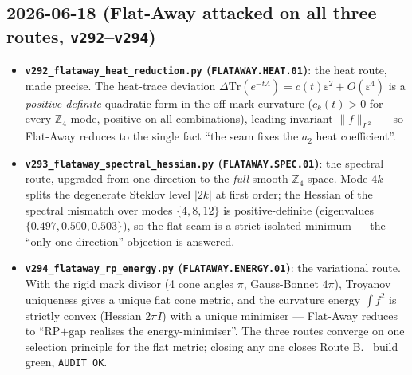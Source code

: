 \subsection*{2026-06-18 (Flat-Away attacked on all three routes, \texttt{v292}--\texttt{v294})}
\begin{itemize}
\item \textbf{\texttt{v292\_flataway\_heat\_reduction.py} (\texttt{FLATAWAY.HEAT.01})}: the heat route, made
  precise. The heat-trace deviation $\Delta\mathrm{Tr}(e^{-t\Lambda})=c(t)\varepsilon^2+O(\varepsilon^4)$ is a
  \emph{positive-definite} quadratic form in the off-mark curvature ($c_k(t)>0$ for every $\mathbb{Z}_4$ mode,
  positive on all combinations), leading invariant $\|f\|_{L^2}$ --- so Flat-Away reduces to the single fact
  ``the seam fixes the $a_2$ heat coefficient''.
\item \textbf{\texttt{v293\_flataway\_spectral\_hessian.py} (\texttt{FLATAWAY.SPEC.01})}: the spectral route,
  upgraded from one direction to the \emph{full} smooth-$\mathbb{Z}_4$ space. Mode $4k$ splits the degenerate
  Steklov level $|2k|$ at first order; the Hessian of the spectral mismatch over modes $\{4,8,12\}$ is
  positive-definite (eigenvalues $\{0.497,0.500,0.503\}$), so the flat seam is a strict isolated minimum --- the
  ``only one direction'' objection is answered.
\item \textbf{\texttt{v294\_flataway\_rp\_energy.py} (\texttt{FLATAWAY.ENERGY.01})}: the variational route. With
  the rigid mark divisor (4 cone angles $\pi$, Gauss-Bonnet $4\pi$), Troyanov uniqueness gives a unique flat
  cone metric, and the curvature energy $\int f^2$ is strictly convex (Hessian $2\pi I$) with a unique
  minimiser --- Flat-Away reduces to ``RP$+$gap realises the energy-minimiser''. The three routes converge on
  one selection principle for the flat metric; closing any one closes Route B. \mE\ build green,
  \texttt{AUDIT OK}.
\end{itemize}

